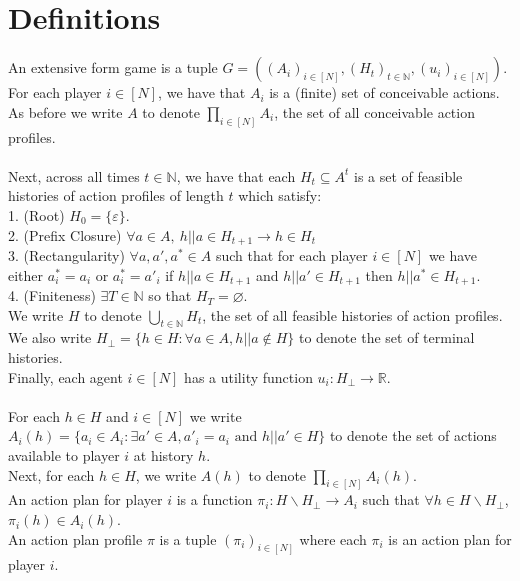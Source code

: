 \documentclass[11pt]{article}
\title{}
\date{}
\theoremstyle{definition}
\theoremstyle{plain}
\begin{document}
\section{Definitions}

An extensive form game is a tuple $G=((A_i)_{i \in [N]},(H_t)_{t \in \mathbb{N}}, (u_i)_{i \in [N]})$.
\\
For each player $i \in [N]$, we have that $A_i$ is a (finite) set of conceivable actions.
\\
As before we write $A$ to denote $\prod_{i \in [N]} A_i$, the set of all conceivable action profiles.
\\
\\
Next, across all times $t \in \mathbb{N}$, we have that each $H_t \subseteq A^t$ is a set of feasible histories of action profiles of length $t$ which satisfy:
\\
1. (Root) $H_0=\{\varepsilon\}$.
\\
2. (Prefix Closure) $\forall a \in A, \ h||a \in H_{t+1} \to h \in H_{t}$
\\
3. (Rectangularity) $\forall a, a', a^* \in A$ such that for each player $i \in [N]$ we have either $a^*_i=a_i$ or $a^*_i=a'_i$ if $h||a \in H_{t+1}$ and $h||a' \in H_{t+1}$ then $h||a^* \in H_{t+1}$.
\\
4. (Finiteness) $\exists T \in \mathbb{N}$ so that $H_T=\varnothing$.
\\
We write $H$ to denote $\bigcup_{t \in \mathbb{N}} H_t$, the set of all feasible histories of action profiles. 
\\
We also write $H_{\bot}=\{h \in H : \forall a \in A, h||a \notin H\}$ to denote the set of terminal histories.
\\
Finally, each agent $i \in [N]$ has a utility function $u_i: H_{\bot} \to \mathbb{R}$.
\\
\\
For each $h \in H$ and $i \in [N]$ we write $A_i(h)=\{a_i \in A_i: \exists a' \in A, a'_i=a_i \text{ and } h||a' \in H\}$ to denote the set of actions available to player $i$ at history $h$.
\\
Next, for each $h \in H$, we write $A(h)$ to denote $\prod_{i \in [N]} A_i(h)$.
\\
An action plan for player $i$ is a function $\pi_i: H\backslash H_{\bot} \to A_i$ such that $\forall h \in H \backslash H_{\bot}$, $\pi_i(h) \in A_i(h)$.
\\
An action plan profile $\pi$ is a tuple $(\pi_i)_{i \in [N]}$ where each $\pi_i$ is an action plan for player $i$.
\\
\end{document}
